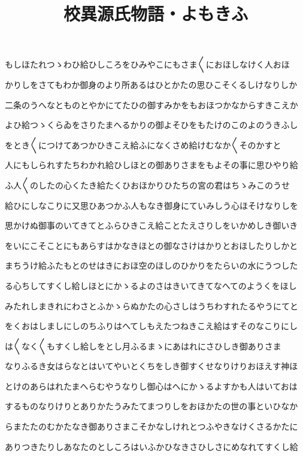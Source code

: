 \documentclass[a4paper,11pt,landscape]{ltjtarticle}
\title{校異源氏物語・よもきふ}
\date{}
\begin{document}
\maketitle

もしほたれつゝわひ給ひしころをひみやこにもさま〱におほしなけく人おほ
\par\medskip
かりしをさてもわか御身のより所あるはひとかたの思ひこそくるしけなりしか
\par\medskip
二条のうへなとものとやかにてたひの御すみかをもおほつかなからすきこえか
\par\medskip
よひ給つゝくらゐをさりたまへるかりの御よそひをもたけのこのよのうきふし
\par\medskip
をとき〱につけてあつかひきこえ給ふになくさめ給けむなか〱そのかすと
\par\medskip
人にもしられすたちわかれ給ひしほとの御ありさまをもよその事に思ひやり給
\par\medskip
ふ人〱のしたの心くたき給たくひおほかりひたちの宮の君はちゝみこのうせ
\par\medskip
給ひにしなこりに又思ひあつかふ人もなき御身にていみしう心ほそけなりしを
\par\medskip
思かけぬ御事のいてきてとふらひきこえ給ことたえさりしをいかめしき御いき
\par\medskip
をいにこそことにもあらすはかなきほとの御なさけはかりとおほしたりしかと
\par\medskip
まちうけ給ふたもとのせはきにおほ空のほしのひかりをたらいの水にうつした
\par\medskip
る心ちしてすくし給しほとにかゝるよのさはきいてきてなへてのようくをほし
\par\medskip
みたれしまきれにわさとふかゝらぬかたの心さしはうちわすれたるやうにてと
\par\medskip
をくおはしましにしのちふりはへてしもえたつねきこえ給はすそのなこりにし
\par\medskip
は〱なく〱もすくし給しをとし月ふるまゝにあはれにさひしき御ありさま
\par\medskip
なりふるき女はらなとはいてやいとくちをしき御すくせなりけりおほえす神ほ
\par\medskip
とけのあらはれたまへらむやうなりし御心はへにかゝるよすかも人はいておは
\par\medskip
するものなりけりとありかたうみたてまつりしをおほかたの世の事といひなか
\par\medskip
らまたたのむかたなき御ありさまこそかなしけれとつふやきなけくさるかたに
\par\medskip
ありつきたりしあなたのとしころはいふかひなきさひしさにめなれてすくし給
\end{document}
